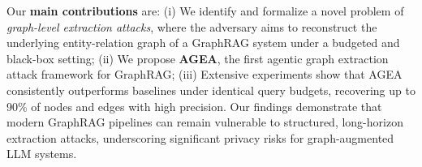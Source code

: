 Our \textbf{main contributions} are: (i) We identify and formalize a novel problem of \emph{graph-level extraction attacks}, where the adversary aims to reconstruct the underlying entity-relation graph of a GraphRAG system under a budgeted and black-box setting;  
(ii) We propose \textbf{AGEA}, the first agentic graph extraction attack framework for GraphRAG; 
(iii) Extensive experiments show that AGEA consistently outperforms baselines under identical query budgets, recovering up to 90\% of nodes and edges with high precision. Our findings demonstrate that modern GraphRAG pipelines can remain vulnerable to structured, long-horizon extraction attacks, underscoring significant privacy risks for graph-augmented LLM systems.


